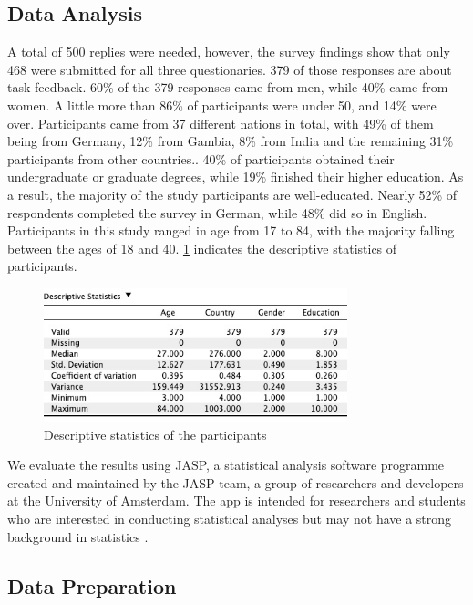\documentclass[conference]{IEEEtran}
\begin{document}
	\subsection[htbp]{Data Analysis}
	
		A total of 500 replies were needed, however, the survey findings show that only 468 were submitted for all three questionaries. 379 of those responses are about task feedback. 60\% of the 379 responses came from men, while 40\% came from women. A little more than 86\% of participants were under 50, and 14\% were over. Participants came from 37 different nations in total, with 49\% of them being from Germany, 12\% from Gambia, 8\% from India and the remaining 31\% participants from other countries.. 40\% of participants obtained their undergraduate or graduate degrees, while 19\% finished their higher education. As a result, the majority of the study participants are well-educated. Nearly 52\% of respondents completed the survey in German, while 48\% did so in English. Participants in this study ranged in age from 17 to 84, with the majority falling between the ages of 18 and 40. \figurename{\ref{Descriptive statistics of the participants}} indicates the descriptive statistics of participants.\\ 
		
		\begin{figure}[htbp]
		\centerline{\includegraphics[width=88mm,scale=1]{Descriptive Statistics of participants.jpeg}}
		\caption{Descriptive statistics of the participants}
		\label{Descriptive statistics of the participants}
		\end{figure}
		We evaluate the results using JASP, a statistical analysis software programme created and maintained by the JASP team, a group of researchers and developers at the University of Amsterdam. The app is intended for researchers and students who are interested in conducting statistical analyses but may not have a strong background in statistics \cite{b10}. 
		
		\subsection{Data Preparation}
		
\end{document}
